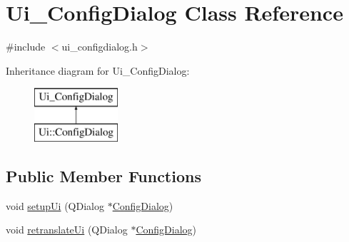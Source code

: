 \hypertarget{class_ui___config_dialog}{}\section{Ui\+\_\+\+Config\+Dialog Class Reference}
\label{class_ui___config_dialog}


{\ttfamily \#include $<$ui\+\_\+configdialog.\+h$>$}

Inheritance diagram for Ui\+\_\+\+Config\+Dialog\+:\begin{figure}[H]
\begin{center}
\leavevmode
\includegraphics[height=2.000000cm]{d8/d6e/class_ui___config_dialog}
\end{center}
\end{figure}
\subsection*{Public Member Functions}
\begin{DoxyCompactItemize}
\item 
void \mbox{\hyperlink{class_ui___config_dialog_a3b38bb7b9733099bde7fdee708b64fd8}{setup\+Ui}} (Q\+Dialog $\ast$\mbox{\hyperlink{class_config_dialog}{Config\+Dialog}})
\item 
void \mbox{\hyperlink{class_ui___config_dialog_ab60d649af45498dee23f4e61fcfe94d8}{retranslate\+Ui}} (Q\+Dialog $\ast$\mbox{\hyperlink{class_config_dialog}{Config\+Dialog}})
\end{DoxyCompactItemize}
